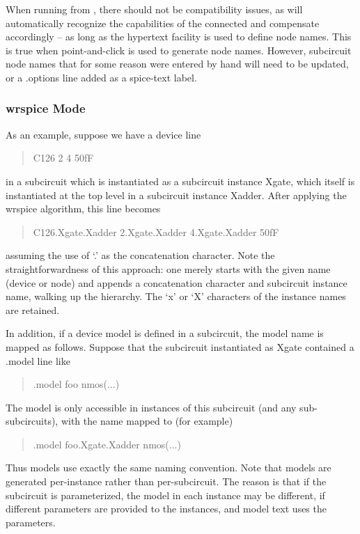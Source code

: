 When running from {\Xic}, there should not be compatibility issues, as
{\Xic} will automatically recognize the capabilities of the connected
{\WRspice} and compensate accordingly -- as long as the hypertext
facility is used to define node names.  This is true when
point-and-click is used to generate node names.  However, subcircuit
node names that for some reason were entered by hand will need to be
updated, or a {\vt .options} line added as a spice-text label.

\subsubsection{{\vt wrspice} Mode}

As an example, suppose we have a device line
\begin{quote}\vt
C126 2 4 50fF
\end{quote}
in a subcircuit which is instantiated as a subcircuit instance {\vt
Xgate}, which itself is instantiated at the top level in a subcircuit
instance {\vt Xadder}.  After applying the {\vt wrspice} algorithm, this
line becomes
\begin{quote}\vt
C126.Xgate.Xadder 2.Xgate.Xadder 4.Xgate.Xadder 50fF
\end{quote}
assuming the use of `{\vt .}' as the concatenation character.  Note
the straightforwardness of this approach:  one merely starts with the
given name (device or node) and appends a concatenation character and
subcircuit instance name, walking up the hierarchy.  The `{\vt x}' or
`{\vt X}' characters of the instance names are retained.

In addition, if a device model is defined in a subcircuit, the model
name is mapped as follows.  Suppose that the subcircuit instantiated
as {\vt Xgate} contained a {\vt .model} line like
\begin{quote}\vt
.model foo nmos(...)
\end{quote}

The model is only accessible in instances of this subcircuit (and any
sub-subcircuits), with the name mapped to (for example)
\begin{quote}\vt
.model foo.Xgate.Xadder nmos(...)
\end{quote}

Thus models use exactly the same naming convention.  Note that models
are generated per-instance rather than per-subcircuit.  The reason is
that if the subcircuit is parameterized, the model in each instance
may be different, if different parameters are provided to the
instances, and model text uses the parameters.

